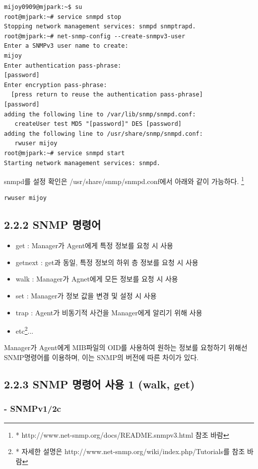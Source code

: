 \documentclass[11pt
  , a4paper
  , article
  , oneside
]{memoir}
\begin{document}
\begin{lstlisting}[style=termstyle]
mijoy0909@mjpark:~$ su                                     
root@mjpark:~# service snmpd stop
Stopping network management services: snmpd snmptrapd.
root@mjpark:~# net-snmp-config --create-snmpv3-user
Enter a SNMPv3 user name to create: 
mijoy
Enter authentication pass-phrase: 
[password]
Enter encryption pass-phrase: 
  [press return to reuse the authentication pass-phrase]
[password]
adding the following line to /var/lib/snmp/snmpd.conf:
   createUser test MD5 "[password]" DES [password]
adding the following line to /usr/share/snmp/snmpd.conf:
   rwuser mijoy
root@mjpark:~# service snmpd start
Starting network management services: snmpd.
\end{lstlisting}

snmpd를 설정 확인은 /usr/share/snmp/snmpd.conf에서 아래와 같이 가능하다. \footnote{* http://www.net-snmp.org/docs/README.snmpv3.html 참조 바람}

\begin{lstlisting}[style=termstyle]
rwuser mijoy
\end{lstlisting}


\subsection{2.2.2 SNMP 명령어}
\begin{itemize}
\item get : Manager가 Agent에게 특정 정보를 요청 시 사용
\item getnext : get과 동일, 특정 정보의 하위 층 정보를 요청 시 사용
\item walk : Manager가 Agnet에게 모든 정보를 요청 시 사용
\item set : Manager가 정보 값을 변경 및 설정 시 사용
\item trap : Agent가 비동기적 사건을 Manager에게 알리기 위해 사용
\item etc\footnote{* 자세한 설명은 http://www.net-snmp.org/wiki/index.php/Tutorials를 참조 바람}...
\end{itemize}

Manager가 Agent에게 MIB파일의 OID를 사용하여 원하는 정보를 요청하기 위해선 SNMP명령어를 이용하며, 이는 SNMP의 버전에 따른 차이가 있다.

\subsection{2.2.3 SNMP 명령어 사용 1 (walk, get)}
\subsubsection{- SNMPv1/2c}
\end{document}
